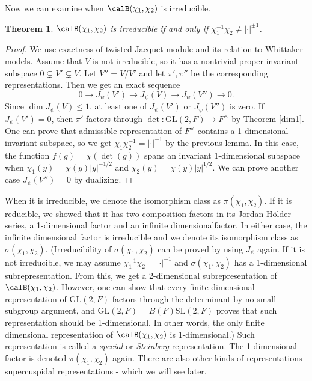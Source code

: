 \documentclass{article}
\newtheorem{theorem}{Theorem}[section]
\newcommand{\GL}{\mathrm{GL}}
\newcommand{\SL}{\mathrm{SL}}
\begin{document}
Now we can examine when $\calB(\chi_1, \chi_2)$ is irreducible. 
\begin{theorem}
$\calB(\chi_1, \chi_2)$ is irreducible if and only if $\chi_1^{-1}\chi_2 \neq  |\cdot|^{\pm 1}$. 
\end{theorem}
\begin{proof}
We use exactness of twisted Jacquet module and its relation to Whittaker models. 
Assume that $V$ is not irreducible, so it has a nontrivial proper invariant subspace $0\subsetneq V'\subsetneq V$. 
Let $V'' = V/V'$ and let $\pi', \pi''$ be the corresponding representations. 
Then we get an exact sequence
$$
0\to J_{\psi}(V') \to J_{\psi}(V) \to J_{\psi}(V'') \to 0. 
$$
Since $\dim J_\psi(V) \leq 1$, at least one of $J_\psi(V')$ or $J_{\psi}(V'')$ is zero. 
If $J_{\psi}(V') = 0$, then $\pi'$ factors through $\det : \GL(2, F) \to F^{\times}$ by Theorem \ref{dim1}. 
One can prove that admissible representation of $F^{\times}$ contains a 1-dimensional invariant subspace, so we get $\chi_1 \chi_2^{-1} = |\cdot|^{-1}$ by the previous lemma. In this case, the function $f(g) = \chi(\det(g))$ spans an invariant 1-dimensional subspace when $\chi_{1}(y) = \chi(y)|y|^{-1/2}$ and $\chi_{2}(y) = \chi(y)|y|^{1/2}$. 
We can prove another case $J_\psi(V'') = 0$ by dualizing. 
\end{proof}
When it is irreducible, we denote the isomorphism class as $\pi(\chi_1, \chi_2)$. If it is reducible, we showed that it has two composition factors in its Jordan-H\"older series, a 1-dimensional factor and an infinite dimensionalfactor. 
In either case, the infinite dimensional factor is irreducible and we denote its isomorphism class as $\sigma(\chi_1, \chi_2)$. 
(Irreducibility of $\sigma(\chi_1, \chi_2)$ can be proved by using $J_{\psi}$ again. If it is not irreducible, we may assume $\chi_{1}^{-1}\chi_{2} = |\cdot |^{-1}$ and $\sigma(\chi_1, \chi_2)$ has a 1-dimensional subrepresentation. 
From this, we get a 2-dimensional subrepresentation of $\calB(\chi_1, \chi_2)$. 
However, one can show that every finite dimensional representation of $\GL(2, F)$ factors through the determinant by no small subgroup argument, and $\GL(2, F) = B(F) \SL(2, F)$ proves that such representation should be 1-dimensional. In other words, the only finite dimensional representation of $\calB(\chi_1, \chi_2)$ is 1-dimensional.)
Such representation is called a \emph{special} or \emph{Steinberg} representation. 
The 1-dimensional factor is denoted $\pi(\chi_1, \chi_2)$ again. There are also other kinds of representations - supercuspidal representations - which we will see later. 
\end{document}

